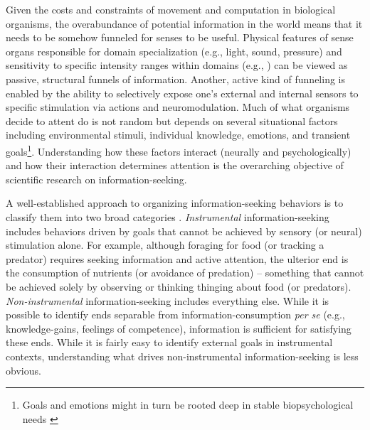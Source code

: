 Given the costs and constraints of movement and computation in biological organisms, the overabundance of potential information in the world means that it needs to be somehow funneled \cite{gottlieb_towards_2018} for senses to be useful. Physical features of sense organs responsible for domain specialization (e.g., light, sound, pressure) and sensitivity to specific intensity ranges within domains (e.g., \cite{schwab_evolution_2018}) can be viewed as passive, structural funnels of information. Another, active kind of funneling is enabled by the ability to selectively expose one's external and internal sensors to specific stimulation via actions and neuromodulation. Much of what organisms decide to attent do is not random but depends on several situational factors including environmental stimuli, individual knowledge, emotions, and transient goals\footnote{Goals and emotions might in turn be rooted deep in stable biopsychological needs \cite{ryan2017self}}. Understanding how these factors interact (neurally and psychologically) and how their interaction determines attention is the overarching objective of scientific research on information-seeking.

A well-established approach to organizing information-seeking behaviors is to classify them into two broad categories \cite{gottlieb_information-seeking_2013,gottlieb_towards_2018}. \emph{Instrumental} information-seeking includes behaviors driven by goals that cannot be achieved by sensory (or neural) stimulation alone. For example, although foraging for food (or tracking a predator) requires seeking information and active attention, the ulterior end is the consumption of nutrients (or avoidance of predation) -- something that cannot be achieved solely by observing or thinking thinging about food (or predators). \emph{Non-instrumental} information-seeking includes everything else. While it is possible to identify ends separable from information-consumption \emph{per se} (e.g., knowledge-gains, feelings of competence), information is sufficient for satisfying these ends.  While it is fairly easy to identify external goals in instrumental contexts, understanding what drives non-instrumental information-seeking is less obvious.



